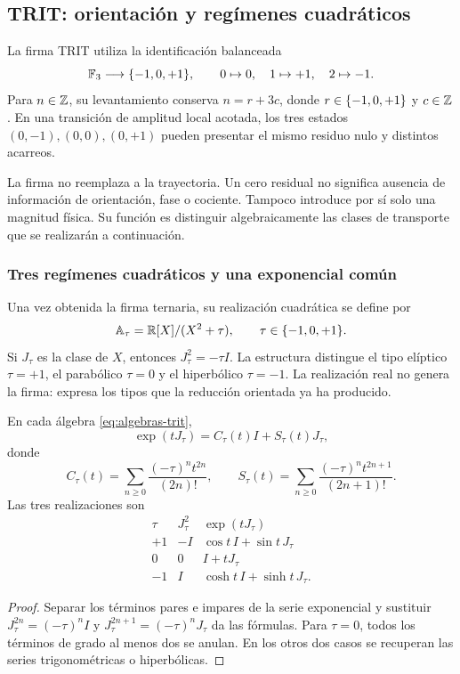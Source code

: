 \subsection{TRIT: orientación y regímenes cuadráticos}

\begin{definition}
La firma TRIT utiliza la identificación balanceada
\[
 \mathbb F_3\longrightarrow\{-1,0,+1\},\qquad 0\mapsto0,\quad1\mapsto+1,\quad2\mapsto-1.
\]
Para \(n\in\mathbb Z\), su levantamiento conserva \(n=r+3c\), donde \(r\in\{-1,0,+1\}\) y \(c\in\mathbb Z\). En una transición de amplitud local acotada, los tres estados \((0,-1),(0,0),(0,+1)\) pueden presentar el mismo residuo nulo y distintos acarreos.
\end{definition}

La firma no reemplaza a la trayectoria. Un cero residual no significa ausencia de información de orientación, fase o cociente. Tampoco introduce por sí solo una magnitud física. Su función es distinguir algebraicamente las clases de transporte que se realizarán a continuación.

\subsubsection{Tres regímenes cuadráticos y una exponencial común}

Una vez obtenida la firma ternaria, su realización cuadrática se define por
\begin{equation}
 \mathbb A_\tau=\mathbb R[X]/(X^2+\tau),\qquad \tau\in\{-1,0,+1\}.
 \label{eq:algebras-trit}
\end{equation}
Si \(J_\tau\) es la clase de \(X\), entonces \(J_\tau^2=-\tau I\). La estructura distingue el tipo elíptico \(\tau=+1\), el parabólico \(\tau=0\) y el hiperbólico \(\tau=-1\). La realización real no genera la firma: expresa los tipos que la reducción orientada ya ha producido.

\begin{proposition}
En cada álgebra \eqref{eq:algebras-trit},
\begin{equation}
 \exp(tJ_\tau)=C_\tau(t)I+S_\tau(t)J_\tau,
\end{equation}
donde
\[
 C_\tau(t)=\sum_{n\ge0}\frac{(-\tau)^nt^{2n}}{(2n)!},\qquad
 S_\tau(t)=\sum_{n\ge0}\frac{(-\tau)^nt^{2n+1}}{(2n+1)!}.
\]
Las tres realizaciones son
\[
 \begin{array}{c|c|c}
 \tau&J_\tau^2&\exp(tJ_\tau)\\\hline
 +1&-I&\cos t\,I+\sin t\,J_\tau\\
 0&0&I+tJ_\tau\\
 -1&I&\cosh t\,I+\sinh t\,J_\tau.
 \end{array}
\]
\end{proposition}
\begin{proof}
Separar los términos pares e impares de la serie exponencial y sustituir \(J_\tau^{2n}=(-\tau)^nI\) y \(J_\tau^{2n+1}=(-\tau)^nJ_\tau\) da las fórmulas. Para \(\tau=0\), todos los términos de grado al menos dos se anulan. En los otros dos casos se recuperan las series trigonométricas o hiperbólicas.
\end{proof}

